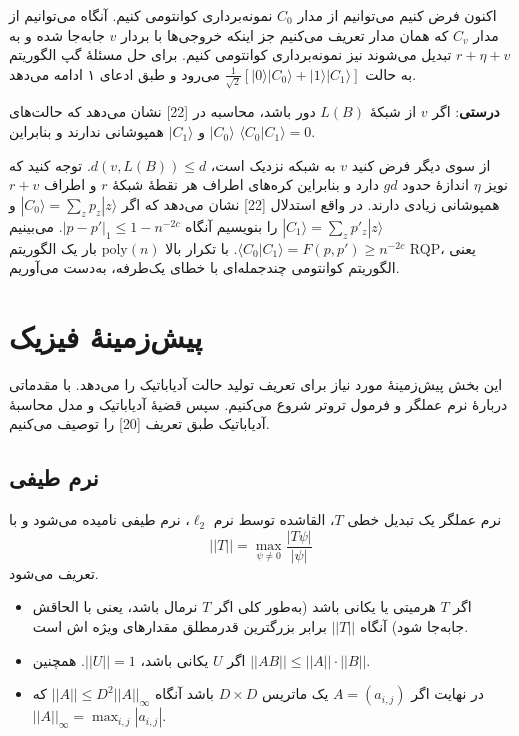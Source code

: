 اکنون فرض کنیم می‌توانیم از مدار $C_0$ نمونه‌برداری کوانتومی کنیم. آنگاه می‌توانیم از مدار $C_v$ که همان مدار تعریف می‌کنیم جز اینکه خروجی‌ها با بردار $v$ جابه‌جا شده و به $r + \eta + v$ تبدیل می‌شوند نیز نمونه‌برداری کوانتومی کنیم. برای حل مسئلهٔ گپ الگوریتم به حالت $\frac{1}{\sqrt{2}}[|0\rangle |C_0\rangle + |1\rangle |C_1\rangle]$ می‌رود و طبق ادعای ۱ ادامه می‌دهد.

\textbf{درستی}:
 اگر $v$ از شبکهٔ $L(B)$ دور باشد، محاسبه در [22] نشان می‌دهد که حالت‌های $|C_0\rangle$ و $|C_1\rangle$ همپوشانی ندارند و بنابراین $\langle C_0 | C_1 \rangle = 0$. 
 
\noindent
از سوی دیگر فرض کنید $v$ به شبکه نزدیک است، $d(v, L(B)) \le d$. توجه کنید که نویز $\eta$ اندازهٔ حدود $gd$ دارد و بنابراین کره‌های اطراف هر نقطهٔ شبکهٔ $r$ و اطراف $r + v$ همپوشانی زیادی دارند. در واقع استدلال [22] نشان می‌دهد که اگر $|C_0\rangle = \sum_z p_z |z\rangle$ و $|C_1\rangle = \sum_z p'_z |z\rangle$ را بنویسیم آنگاه $|p - p'|_1 \le 1 - n^{-2c}$. می‌بینیم $\langle C_0 | C_1 \rangle = F(p, p') \ge n^{-2c}$. با تکرار بالا $\mathrm{poly}(n)$ بار یک الگوریتم RQP، یعنی الگوریتم کوانتومی چندجمله‌ای با خطای یک‌طرفه، به‌دست می‌آوریم.
\section{ پیش‌زمینهٔ فیزیک}
این بخش پیش‌زمینهٔ مورد نیاز برای تعریف تولید حالت آدیاباتیک را می‌دهد. با مقدماتی دربارهٔ نرم عملگر و فرمول تروتر شروع می‌کنیم. سپس قضیهٔ آدیاباتیک و مدل محاسبهٔ آدیاباتیک طبق تعریف [20] را توصیف می‌کنیم.

\subsection{ نرم طیفی}

نرم عملگر یک تبدیل خطی $T$، القاشده توسط نرم $\ell_2$، نرم طیفی نامیده می‌شود و با
\[
||T|| = \max_{\psi \neq 0} \frac{|T\psi|}{|\psi|}
\]
تعریف می‌شود. 
\begin{itemize}
	\item 
	اگر $T$ هرمیتی یا یکانی باشد (به‌طور کلی اگر $T$ نرمال باشد، یعنی با الحاقش جابه‌جا شود) آنگاه $||T||$ برابر بزرگترین قدرمطلق ‌مقدارهای ویژه اش است.
	\item
	اگر $U$ یکانی باشد، $||U|| = 1$.  همچنین $||AB|| \le ||A|| \cdot ||B||$. 
	\item
	در نهایت اگر $A = (a_{i,j})$ یک ماتریس $D \times D$ باشد آنگاه $||A|| \le D^2 ||A||_\infty$ که $||A||_\infty = \max_{i,j} |a_{i,j}|$.
\end{itemize}
 
